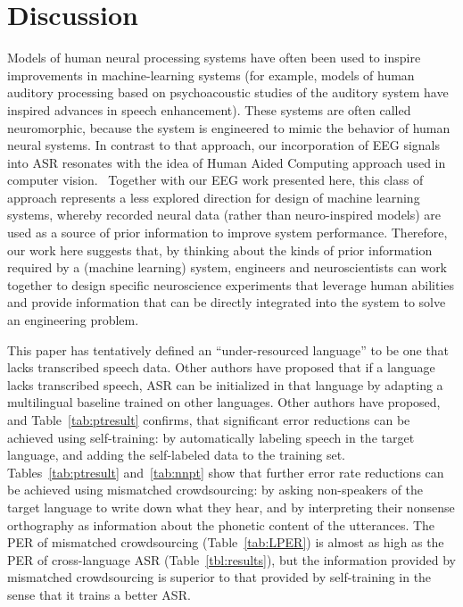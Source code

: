 \section{Discussion}

Models of human neural processing systems have often been used to
inspire improvements in machine-learning systems (for example, models of
human auditory processing based on psychoacoustic studies of the
auditory system have inspired advances in speech enhancement). These
systems are often called neuromorphic, because the system is engineered
to mimic the behavior of human neural systems. In contrast to that
approach, our incorporation of EEG signals into ASR resonates with the
idea of Human Aided Computing approach used in computer
vision.~\cite{Shenoy08,Wang09} Together with our EEG work presented here,
this class of approach represents a less explored direction for design
of machine learning systems, whereby recorded neural data (rather than
neuro-inspired models) are used as a source of prior information to
improve system performance. Therefore, our work here suggests that, by
thinking about the kinds of prior information required by a (machine
learning) system, engineers and neuroscientists can work together to
design specific neuroscience experiments that leverage human abilities
and provide information that can be directly integrated into the system
to solve an engineering problem.

This paper has tentatively defined an ``under-resourced language'' to
be one that lacks transcribed speech data.  Other authors have
proposed that if a language lacks transcribed speech, ASR can be
initialized in that language by adapting a multilingual baseline
trained on other languages.  Other authors have proposed, and
Table~\ref{tab:ptresult} confirms, that significant error reductions
can be achieved using self-training: by automatically labeling speech
in the target language, and adding the self-labeled data to the
training set.  Tables~\ref{tab:ptresult} and~\ref{tab:nnpt} show that
further error rate reductions can be achieved using mismatched
crowdsourcing: by asking non-speakers of the target language to write
down what they hear, and by interpreting their nonsense orthography as
information about the phonetic content of the utterances.  The PER of
mismatched crowdsourcing (Table~\ref{tab:LPER}) is almost as high as
the PER of cross-language ASR (Table~\ref{tbl:results}), but the
information provided by mismatched crowdsourcing is superior to that
provided by self-training in the sense that it trains a better ASR.

